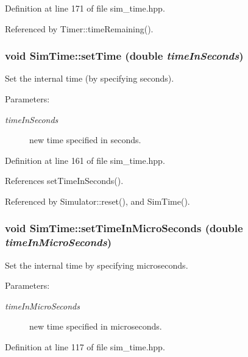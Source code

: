 Definition at line 171 of file sim\_\-time.hpp.

Referenced by Timer::time\-Remaining().
\subsubsection{\setlength{\rightskip}{0pt plus 5cm}void Sim\-Time::set\-Time (double {\em time\-In\-Seconds})\hspace{0.3cm}{\tt  [inline]}}\label{classSimTime_146f426d5761487511ee02a0c14f7ef1}


Set the internal time (by specifying seconds). 

\begin{Desc}
\item[Parameters:]
\begin{description}
\item[{\em time\-In\-Seconds}]new time specified in seconds. \end{description}
\end{Desc}


Definition at line 161 of file sim\_\-time.hpp.

References set\-Time\-In\-Seconds().

Referenced by Simulator::reset(), and Sim\-Time().
\subsubsection{\setlength{\rightskip}{0pt plus 5cm}void Sim\-Time::set\-Time\-In\-Micro\-Seconds (double {\em time\-In\-Micro\-Seconds})\hspace{0.3cm}{\tt  [inline]}}\label{classSimTime_7fb16a92ef70ac95eb938741c014526d}


Set the internal time by specifying microseconds. 

\begin{Desc}
\item[Parameters:]
\begin{description}
\item[{\em time\-In\-Micro\-Seconds}]new time specified in microseconds. \end{description}
\end{Desc}


Definition at line 117 of file sim\_\-time.hpp.
